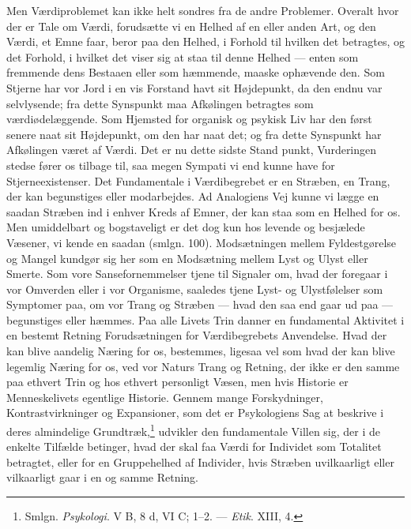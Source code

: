 \documentclass[12pt,a4paper]{book}
\newcommand{\opage}[1]{\marginnote{\footnotesize\textit{[#1]}}}
\begin{document}
Men Værdiproblemet kan ikke helt sondres fra de andre Problemer. Overalt hvor der er Tale
om Værdi, forudsætte vi en Helhed af en eller anden Art, og den Værdi, et Emne faar, beror
paa den Helhed, i Forhold til hvilken det betragtes, og det Forhold, i hvilket det viser
sig at staa til denne Helhed --- enten som fremmende dens Bestaaen eller som hæmmende,
maaske ophævende den. Som Stjerne har vor Jord i en vis Forstand havt sit Højdepunkt, da
den endnu var selvlysende; fra dette Synspunkt maa Afkølingen betragtes som
værdiødelæggende. Som Hjemsted for organisk og psykisk Liv har den først senere naat sit
Højdepunkt, om den har naat det; og fra dette Synspunkt har Afkølingen været af Værdi. Det
er nu dette sidste Stand%
\opage{347}punkt, Vurderingen stedse fører os tilbage til, saa megen Sympati
vi end kunne have for Stjerneexistenser. Det Fundamentale i Værdibegrebet er en Stræben, en
Trang, der kan begunstiges eller modarbejdes. Ad Analogiens Vej kunne vi lægge en saadan
Stræben ind i enhver Kreds af Emner, der kan staa som en Helhed for os. Men umiddelbart og
bogstaveligt er det dog kun hos levende og besjælede Væsener, vi kende en saadan (smlgn.
100). Modsætningen mellem Fyldestgørelse og Mangel kundgør sig her som en Modsætning mellem
Lyst og Ulyst eller Smerte. Som vore Sansefornemmelser tjene til Signaler om, hvad der
foregaar i vor Omverden eller i vor Organisme, saaledes tjene Lyst- og Ulystfølelser som
Symptomer paa, om vor Trang og Stræben --- hvad den saa end gaar ud paa --- begunstiges
eller hæmmes. Paa alle Livets Trin danner en fundamental Aktivitet i en bestemt Retning
Forudsætningen for Værdibegrebets Anvendelse. Hvad der kan blive aandelig Næring for os,
bestemmes, ligesaa vel som hvad der kan blive legemlig Næring for os, ved vor Naturs Trang
og Retning, der ikke er den samme paa ethvert Trin og hos ethvert personligt Væsen, men hvis Historie er Menneskelivets egentlige Historie. Gennem mange Forskydninger,
Kontrastvirkninger og Expansioner, som det er Psykologiens Sag at beskrive i deres
almindelige Grundtræk,\footnote{Smlgn. \emph{Psykologi}. V B, 8 d, VI C; 1--2. ---
\emph{Etik}. XIII, 4.} udvikler den fundamentale Villen sig, der i de enkelte Tilfælde
betinger, hvad der skal faa Værdi for Individet som Totalitet betragtet, eller for en
Gruppehelhed af Individer, hvis Stræben uvilkaarligt eller vilkaarligt gaar i en og samme
Retning.
\end{document}
